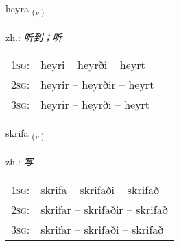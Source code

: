 \documentclass[frontgrid, backgrid]{flacards}\usepackage[]{graphicx}\usepackage[]{xcolor}
\begin{document}
\renewcommand{\flhead}{\vskip5pt \fboxsep=0pt {\small\bfseries\footnotesize Sagnorð | 动词}}
\renewcommand{\fcfoot}{\vskip5pt \fboxsep=0pt \hspace{2pt}{\small\bfseries\footnotesize 1K}}

\renewcommand{\blhead}{\vskip5pt {\small\bfseries\footnotesize Sagnorð | 动词 }}
\renewcommand{\bcfoot}{\vskip5pt \hspace{2pt}{\small\bfseries\footnotesize 1K}}


{heyra \small{\textsubscript{(\textit{v.})}} \\[1ex] %
\textphonetic{[heiːra]} \\
zh.: \emph{听到；听} \\  [2ex]
\renewcommand*{\arraystretch}{0.8}
\begin{tabular}{p{1cm}l}
\textsc{1sg}: & heyri -- heyrði -- heyrt \\ 
\textsc{2sg}: & heyrir -- heyrðir -- heyrt \\ 
\textsc{3sg}: & heyrir -- heyrði -- heyrt \\ 
\end{tabular}
}

\renewcommand{\flhead}{\vskip5pt \fboxsep=0pt {\small\bfseries\footnotesize Sagnorð | 动词}}
\renewcommand{\fcfoot}{\vskip5pt \fboxsep=0pt \hspace{2pt}{\small\bfseries\footnotesize 1K}}

\renewcommand{\blhead}{\vskip5pt {\small\bfseries\footnotesize Sagnorð | 动词 }}
\renewcommand{\bcfoot}{\vskip5pt \hspace{2pt}{\small\bfseries\footnotesize 1K}}


{skrifa \small{\textsubscript{(\textit{v.})}} \\[1ex] %
\textphonetic{[skrɪːva]} \\
zh.: \emph{写} \\  [2ex]
\renewcommand*{\arraystretch}{0.8}
\begin{tabular}{p{1cm}l}
\textsc{1sg}: & skrifa -- skrifaði -- skrifað \\ 
\textsc{2sg}: & skrifar -- skrifaðir -- skrifað \\ 
\textsc{3sg}: & skrifar -- skrifaði -- skrifað \\ 
\end{tabular}
}
\end{document}
